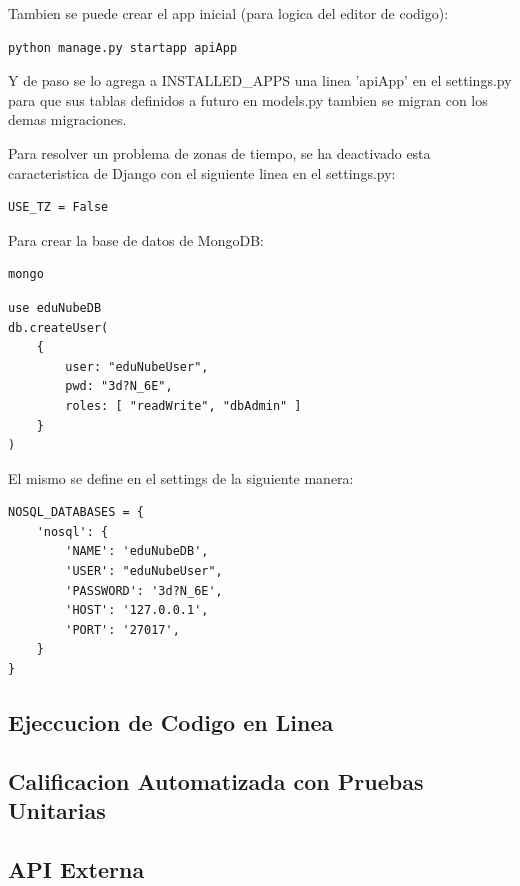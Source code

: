 Tambien se puede crear el app inicial (para logica del editor de codigo):
\begin{lstlisting}
python manage.py startapp apiApp
\end{lstlisting}

Y de paso se lo agrega a INSTALLED\_APPS una linea 'apiApp' en el settings.py para que sus tablas definidos a futuro en models.py tambien se migran con los demas migraciones.

Para resolver un problema de zonas de tiempo, se ha deactivado esta caracteristica de Django con el siguiente linea en el settings.py:
\lstset{language=Python}
\begin{lstlisting}
USE_TZ = False
\end{lstlisting}
\lstset{language=Bash}

Para crear la base de datos de MongoDB:
\begin{lstlisting}
mongo
\end{lstlisting}
\lstset{language=sql}
\begin{lstlisting}
use eduNubeDB
db.createUser(
    {
        user: "eduNubeUser",
        pwd: "3d?N_6E",
        roles: [ "readWrite", "dbAdmin" ]
    }
)
\end{lstlisting}
\lstset{language=Bash}

El mismo se define en el settings de la siguiente manera:
\lstset{language=Python}
\begin{lstlisting}
NOSQL_DATABASES = {
    'nosql': {
        'NAME': 'eduNubeDB',
        'USER': "eduNubeUser",
        'PASSWORD': '3d?N_6E',
        'HOST': '127.0.0.1',
        'PORT': '27017',
    }
}
\end{lstlisting}
\lstset{language=Bash}

\subsection{Ejeccucion de Codigo en Linea}

\subsection{Calificacion Automatizada con Pruebas Unitarias}

\subsection{API Externa}
